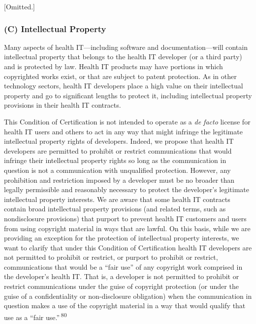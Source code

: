 \documentclass[twoside,11pt]{article}
\begin{document}
          [Omitted.]


          \subsubsection{(C) Intellectual Property}

          Many aspects of health IT—including software and documentation—will contain intellectual property that belongs to the health IT developer (or a third party) and is protected by law. Health IT products may have portions in which copyrighted works exist, or that are subject to patent protection. As in other technology sectors, health IT developers place a high value on their intellectual property and go to significant lengths to protect it, including intellectual property provisions in their health IT contracts.



          This Condition of Certification is not intended to operate as a \emph{de facto} license for health IT users and others to act in any way that might infringe the legitimate intellectual property rights of developers. Indeed, we propose that health IT developers are permitted to prohibit or restrict communications that would infringe their intellectual property rights so long as the communication in question is not a communication with unqualified protection. However, any prohibition and restriction imposed by a developer must be no broader than legally permissible and reasonably necessary to protect the developer's legitimate intellectual property interests. We are aware that some health IT contracts contain broad intellectual property provisions (and related terms, such as nondisclosure provisions) that purport to prevent health IT customers and users from using copyright material in ways that are lawful. On this basis, while we are providing an exception for the protection of intellectual property interests, we want to clarify that under this Condition of Certification health IT developers are not permitted to prohibit or restrict, or purport to prohibit or restrict, communications that would be a “fair use” of any copyright work comprised in the developer's health IT. That is, a developer is not permitted to prohibit or restrict communications under the guise of copyright protection (or under the guise of a confidentiality or non-disclosure obligation) when the communication in question makes a use of the copyright material in a way that would qualify that use as a “fair use.” \textsuperscript{80}
            
\end{document}
